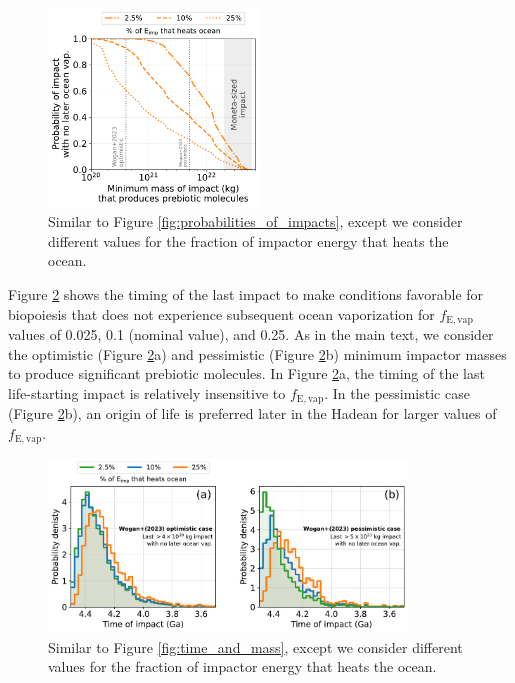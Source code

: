 \documentclass{aastex631}
\begin{document}
\begin{figure}
  \centering
  \includegraphics[width=0.5\textwidth]{figures/probabilities_of_impacts_sens.pdf}
  \caption{Similar to Figure \ref{fig:probabilities_of_impacts}, except we consider different values for the fraction of impactor energy that heats the ocean.}
  \label{fig:probabilities_of_impacts_sens}
\end{figure}

Figure \ref{fig:timing_sensitivity} shows the timing of the last impact to make conditions favorable for biopoiesis that does not experience subsequent ocean vaporization for $f_\mathrm{E,vap}$ values of 0.025, 0.1 (nominal value), and 0.25. As in the main text, we consider the \citet{Wogan_2023} optimistic (Figure \ref{fig:timing_sensitivity}a) and pessimistic (Figure \ref{fig:timing_sensitivity}b) minimum impactor masses to produce significant prebiotic molecules. In Figure \ref{fig:timing_sensitivity}a, the timing of the last life-starting impact is relatively insensitive to $f_\mathrm{E,vap}$. In the \citet{Wogan_2023} pessimistic case (Figure \ref{fig:timing_sensitivity}b), an origin of life is preferred later in the Hadean for larger values of $f_\mathrm{E,vap}$.

\begin{figure}
  \centering
  \includegraphics[width=0.85\textwidth]{figures/timing_sensitivity.pdf}
  \caption{Similar to Figure \ref{fig:time_and_mass}, except we consider different values for the fraction of impactor energy that heats the ocean.}
  \label{fig:timing_sensitivity}
\end{figure}
\end{document}
